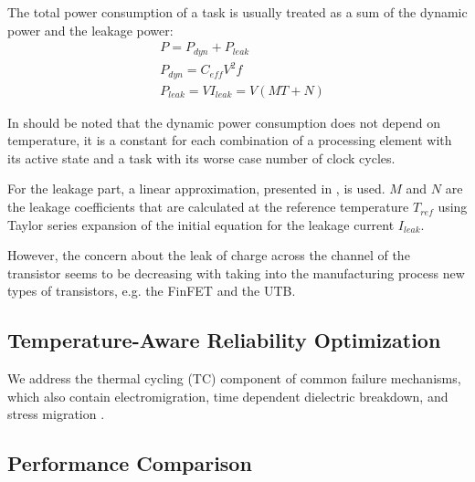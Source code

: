 The total power consumption of a task is usually treated as a sum of the dynamic power and the leakage power:
\begin{align*}
  & P = P_{dyn} + P_{leak} \\
  & P_{dyn} = C_{eff} V^2 f \\
  & P_{leak} = V I_{leak} = V (MT + N)
\end{align*}

In should be noted that the dynamic power consumption does not depend on temperature, it is a constant for each combination of a processing element with its active state and a task with its worse case number of clock cycles.

For the leakage part, a linear approximation, presented in \cite{liu2007}, is used. $M$ and $N$ are the leakage coefficients that are calculated at the reference temperature $T_{ref}$ using Taylor series expansion of the initial equation for the leakage current $I_{leak}$.

However, the concern about the leak of charge across the channel of the transistor seems to be decreasing with taking into the manufacturing process new types of transistors, e.g. the FinFET and the UTB.



\subsection{Temperature-Aware Reliability Optimization}
We address the thermal cycling (TC) component of common failure mechanisms, which also contain electromigration, time dependent dielectric breakdown, and stress migration \cite{xiang2010}.

\subsection{Performance Comparison} \label{sec:comparison}
